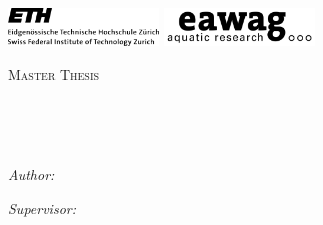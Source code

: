 \documentclass[
11pt, %
english, %
singlespacing, %
headsepline, %
]{MastersDoctoralThesis} %
\author{Sebastiano \textsc{Rusca}} %
\begin{document}
\frontmatter %

\pagestyle{plain} %


\begin{titlepage}


\includegraphics[width=0.3\textwidth]{Figures/eth.png}
\hfill
\includegraphics[width=0.3\textwidth]{Figures/eawag.png}
\vspace{1.5cm}
\begin{center}
\textsc{\Large Master Thesis}\\[0.5cm] %
\vspace{1cm}

\HRule \\[0.4cm] %
{\huge \bfseries \ttitle\par}\vspace{0.4cm} %
\HRule \\[1.5cm] %
 
\begin{minipage}[t]{0.4\textwidth}
\begin{flushleft} \large
\emph{Author:}\\
\authorname %
\end{flushleft}
\end{minipage}
\begin{minipage}[t]{0.4\textwidth}
\begin{flushright} \large
\emph{Supervisor:} \\
\supname %
\end{flushright}
\end{minipage}\\[3cm]


\end{center}
\end{titlepage}
\end{document}
